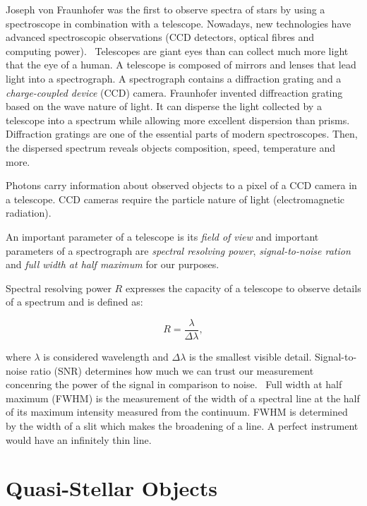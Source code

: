 Joseph von Fraunhofer was the first to observe spectra of stars by using a spectroscope in combination with a telescope.
Nowadays, new technologies have advanced spectroscopic observations
(CCD detectors, optical fibres and computing power).~\cite{cochard2018}
Telescopes are giant eyes than can collect much more light that the eye of a human.
A telescope is composed of mirrors and lenses that lead light into a spectrograph.
A spectrograph contains a diffraction grating and a \textit{charge-coupled device} (CCD) camera.
Fraunhofer invented diffreaction grating based on the wave nature of light.
It can disperse the light collected by a telescope into a spectrum
while allowing more excellent dispersion than prisms.
Diffraction gratings are one of the essential parts of modern spectroscopes.
Then, the dispersed spectrum reveals objects composition, speed, temperature
and more.~\cite{bennett2005}

Photons carry information about observed objects
to a pixel of a CCD camera in a telescope.
CCD cameras require the particle nature of light (electromagnetic radiation).~\cite{trypsteen2017}

An important parameter of a telescope is its \textit{field of view}
and important parameters of a spectrograph are \textit{spectral resolving power}, \textit{signal-to-noise ration} and \textit{full width at half maximum} for our purposes.

Spectral resolving power \(R\) expresses the capacity of a telescope to observe details of a spectrum
and is defined as:

\begin{equation}
	R = \frac{\lambda}{\Delta \lambda},
\end{equation}

where \(\lambda\) is considered wavelength
and \(\Delta \lambda\) is the smallest visible detail.
Signal-to-noise ratio (SNR) determines how much we can trust our measurement
concenring the power of the signal in comparison to noise.~\cite{cochard2018}
Full width at half maximum (FWHM) is the measurement of the width of a spectral line at the half of its maximum intensity measured from the continuum.
FWHM is determined by the width of a slit which makes the broadening of a line.
A perfect instrument would have an infinitely thin line.

\section{Quasi-Stellar Objects}

